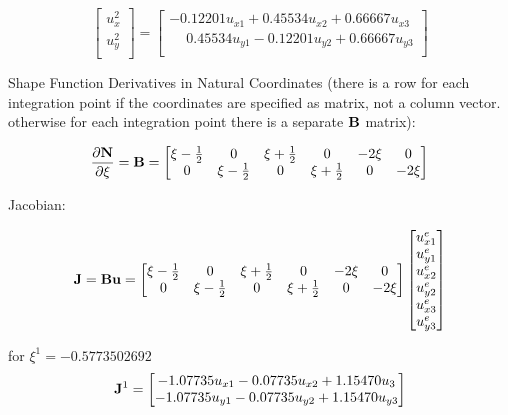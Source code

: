 \begin{equation}
    \begin{bmatrix}
        u_{x}^2 \\
        u_{y}^2 \\
    \end{bmatrix}
    = \begin{bmatrix}
        -0.12201 u_{x1} + 0.45534 u_{x2} + 0.66667 u_{x3} \\
        \phantom{-}0.45534 u_{y1} - 0.12201 u_{y2} + 0.66667 u_{y3} \\
    \end{bmatrix}
\end{equation}

Shape Function Derivatives in Natural Coordinates (there is a row for each
integration point if the coordinates are specified as matrix, not a column
vector. otherwise for each integration point there is a separate $ \mathbf{B} $
matrix):

\begin{equation}
    \frac{\partial \mathbf{N}}{\partial \xi} =
    \mathbf{B} = \begin{bmatrix}
        \xi -\frac{1}{2} & 0 & \xi + \frac{1}{2} & 0 & -2 \xi & 0 \\
        0 & \xi -\frac{1}{2} & 0 & \xi + \frac{1}{2} & 0 & -2 \xi \\
    \end{bmatrix}
\end{equation}

Jacobian:

\begin{equation}
    \mathbf{J} = \mathbf{B} \mathbf{u} =
    \begin{bmatrix}
        \xi -\frac{1}{2} & 0 & \xi + \frac{1}{2} & 0 & -2 \xi & 0 \\
        0 & \xi -\frac{1}{2} & 0 & \xi + \frac{1}{2} & 0 & -2 \xi \\
    \end{bmatrix}
    \begin{bmatrix}
        u_{x1}^e \\
        u_{y1}^e \\
        u_{x2}^e \\
        u_{y2}^e \\
        u_{x3}^e \\
        u_{y3}^e \\
    \end{bmatrix}
\end{equation}

for $ \xi^1 = -0.5773502692 $
\begin{equation}
    \mathbf{J}^1 = \begin{bmatrix}
        -1.07735 u_{x1} -0.07735 u_{x2} + 1.15470 u_{3} \\
        -1.07735 u_{y1} -0.07735 u_{y2} + 1.15470 u_{y3} \\
    \end{bmatrix}
\end{equation}

